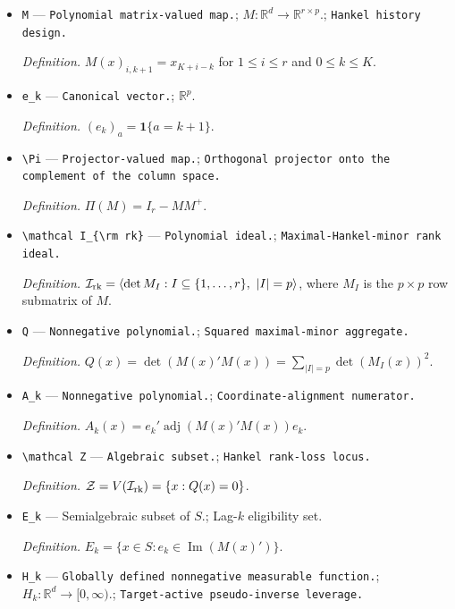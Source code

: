 \documentclass{article}
\begin{document}
\begin{itemize}
  \item \texttt{M} --- \texttt{Polynomial matrix-\allowbreak{}valued map.}; \(M:\mathbb R^d\to\mathbb R^{r\times p}\).; \texttt{Hankel history design.}
  \par\smallskip\noindent\emph{Definition.} \(M(x)_{i,k+1}=x_{K+i-k}\) for \(1\le i\le r\) and \(0\le k\le K\).
  \item \texttt{e\_\allowbreak{}k} --- \texttt{Canonical vector.}; \(\mathbb R^p\).
  \par\smallskip\noindent\emph{Definition.} \((e_k)_a=\mathbf 1\{a=k+1\}\).
  \item \texttt{\textbackslash{}\allowbreak{}Pi} --- \texttt{Projector-\allowbreak{}valued map.}; \texttt{Orthogonal projector onto the complement of the column space.}
  \par\smallskip\noindent\emph{Definition.} \(\Pi(M)=I_r-MM^+\).
  \item \texttt{\textbackslash{}\allowbreak{}mathcal I\_\allowbreak{}\{\textbackslash{}\allowbreak{}rm rk\}\allowbreak{}} --- \texttt{Polynomial ideal.}; \texttt{Maximal-\allowbreak{}Hankel-\allowbreak{}minor rank ideal.}
  \par\smallskip\noindent\emph{Definition.} \(\mathcal I_{\rm rk}=\langle\det M_I: I\subseteq\{1,\ldots,r\},\ |I|=p\rangle\), where \(M_I\) is the \(p\times p\) row submatrix of \(M\).
  \item \texttt{Q} --- \texttt{Nonnegative polynomial.}; \texttt{Squared maximal-\allowbreak{}minor aggregate.}
  \par\smallskip\noindent\emph{Definition.} \(Q(x)=\det(M(x)'M(x))=\sum_{|I|=p}\det(M_I(x))^2\).
  \item \texttt{A\_\allowbreak{}k} --- \texttt{Nonnegative polynomial.}; \texttt{Coordinate-\allowbreak{}alignment numerator.}
  \par\smallskip\noindent\emph{Definition.} \(A_k(x)=e_k'\operatorname{adj}(M(x)'M(x))e_k\).
  \item \texttt{\textbackslash{}\allowbreak{}mathcal Z} --- \texttt{Algebraic subset.}; \texttt{Hankel rank-\allowbreak{}loss locus.}
  \par\smallskip\noindent\emph{Definition.} \(\mathcal Z=V(\mathcal I_{\rm rk})=\{x:Q(x)=0\}\).
  \item \texttt{E\_\allowbreak{}k} --- Semialgebraic subset of \(S\).; Lag-\(k\) eligibility set.
  \par\smallskip\noindent\emph{Definition.} \(E_k=\{x\in S:e_k\in\operatorname{Im}(M(x)')\}\).
  \item \texttt{H\_\allowbreak{}k} --- \texttt{Globally defined nonnegative measurable function.}; \(H_k:\mathbb R^d\to[0,\infty)\).; \texttt{Target-\allowbreak{}active pseudo-\allowbreak{}inverse leverage.}

\end{itemize}
\end{document}
